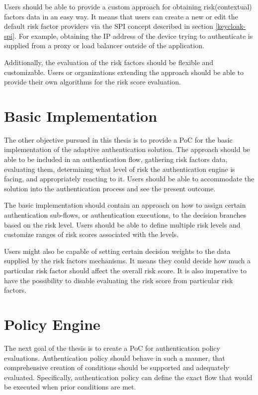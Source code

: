 Users should be able to provide a custom approach for obtaining risk(contextual) factors data in an easy way.
It means that users can create a new or edit the default risk factor providers via the SPI concept described in section \ref{keycloak-spi}.
For example, obtaining the IP address of the device trying to authenticate is supplied from a proxy or load balancer outside of the application.

Additionally, the evaluation of the risk factors should be flexible and customizable.
Users or organizations extending the approach should be able to provide their own algorithms for the risk score evaluation.

\section{Basic Implementation}
The other objective pursued in this thesis is to provide a PoC for the basic implementation of the adaptive authentication solution.
The approach should be able to be included in an authentication flow, gathering risk factors data, evaluating them, determining what level of risk the authentication engine is facing, and appropriately reacting to it.
Users should be able to accommodate the solution into the authentication process and see the present outcome.

The basic implementation should contain an approach on how to assign certain authentication sub-flows, or authentication executions, to the decision branches based on the risk level.
Users should be able to define multiple risk levels and customize ranges of risk scores associated with the levels.

Users might also be capable of setting certain decision weights to the data supplied by the risk factors mechanisms.
It means they could decide how much a particular risk factor should affect the overall risk score.
It is also imperative to have the possibility to disable evaluating the risk score from particular risk factors.

\section{Policy Engine}
The next goal of the thesis is to create a PoC for authentication policy evaluations.
Authentication policy should behave in such a manner, that comprehensive creation of conditions should be supported and adequately evaluated.
Specifically, authentication policy can define the exact flow that would be executed when prior conditions are met.

